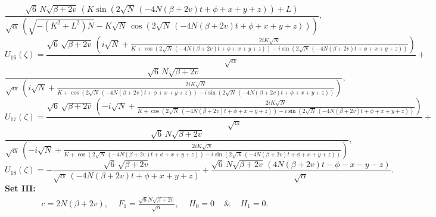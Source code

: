 \documentclass[10pt]{NSP1}
\numberwithin{equation}{section}
\begin{document}
\begin{equation}
\frac{\sqrt{6}\, N \sqrt{\beta +2 v}\, \left(K \sin \! \left(2 \sqrt{N}\, \left(-4 N \left(\beta +2 v \right) t +\phi +x +y +z \right)\right)+L \right)}{\sqrt{\alpha}\, \left(\sqrt{-\left(K^{2}+L^{2}\right) N}-K \sqrt{N}\, \cos \! \left(2 \sqrt{N}\, \left(-4 N \left(\beta +2 v \right) t +\phi +x +y +z \right)\right)\right)},
\end{equation}
\begin{equation}\label{U16}
    U_{16}\! \left(\zeta \right) =
\frac{\sqrt{6}\, \sqrt{\beta +2 v}\, \left(i \sqrt{N}+\frac{2 i K \sqrt{N}}{K +\cos \left(2 \sqrt{N}\, \left(-4 N \left(\beta +2 v \right) t +\phi +x +y +z \right)\right)-i \sin \left(2 \sqrt{N}\, \left(-4 N \left(\beta +2 v \right) t +\phi +x +y +z \right)\right)}\right)}{\sqrt{\alpha}}+\nonumber
\end{equation}
\begin{equation}
\frac{\sqrt{6}\, N \sqrt{\beta +2 v}}{\sqrt{\alpha}\, \left(i \sqrt{N}+\frac{2 i K \sqrt{N}}{K +\cos \left(2 \sqrt{N}\, \left(-4 N \left(\beta +2 v \right) t +\phi +x +y +z \right)\right)-i \sin \left(2 \sqrt{N}\, \left(-4 N \left(\beta +2 v \right) t +\phi +x +y +z \right)\right)}\right)},
\end{equation}
\begin{equation}\label{U17}
    U_{17}\! \left(\zeta \right) =
\frac{\sqrt{6}\, \sqrt{\beta +2 v}\, \left(-i \sqrt{N}+\frac{2 i K \sqrt{N}}{K +\cos \left(2 \sqrt{N}\, \left(-4 N \left(\beta +2 v \right) t +\phi +x +y +z \right)\right)-i \sin \left(2 \sqrt{N}\, \left(-4 N \left(\beta +2 v \right) t +\phi +x +y +z \right)\right)}\right)}{\sqrt{\alpha}}+\nonumber
\end{equation}
\begin{equation}
\frac{\sqrt{6}\, N \sqrt{\beta +2 v}}{\sqrt{\alpha}\, \left(-i \sqrt{N}+\frac{2 i K \sqrt{N}}{K +\cos \left(2 \sqrt{N}\, \left(-4 N \left(\beta +2 v \right) t +\phi +x +y +z \right)\right)-i \sin \left(2 \sqrt{N}\, \left(-4 N \left(\beta +2 v \right) t +\phi +x +y +z \right)\right)}\right)},
\end{equation}
\begin{equation}\label{U18}
    U_{18}\! \left(\zeta \right) =
-\frac{\sqrt{6}\, \sqrt{\beta +2 v}}{\sqrt{\alpha}\, \left(-4 N \left(\beta +2 v \right) t +\phi +x +y +z \right)}+\frac{\sqrt{6}\, N \sqrt{\beta +2 v}\, \left(4 N \left(\beta +2 v \right) t -\phi -x -y -z \right)}{\sqrt{\alpha}}.
\end{equation}
\textbf{Set III:}
\begin{eqnarray}\label{set3}
c = 2N(\beta+2v),\quad\,F_{1} = \frac{\sqrt{6} N \sqrt{\beta+2v}}{\sqrt{\alpha}},\quad\, H_{0} = 0\quad\,{\&}\quad\,H_{1} = 0.
\end{eqnarray}
\end{document}
